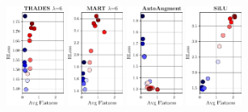 \begin{figure}
	\begin{minipage}[t]{0.12\textwidth} 
	\end{minipage}
	\begin{minipage}[t]{0.11\textwidth}
		\includegraphics[height=3.25cm]{plots_supp_flatness_epochs_correlation_joint_trades6}
	\end{minipage}
	\begin{minipage}[t]{0.11\textwidth}
		\includegraphics[height=3.25cm]{plots_supp_flatness_epochs_correlation_joint_mart6}
	\end{minipage}
	\begin{minipage}[t]{0.11\textwidth}
		\includegraphics[height=3.25cm]{plots_supp_flatness_epochs_correlation_joint_aa}
	\end{minipage}
	\begin{minipage}[t]{0.11\textwidth}
		\includegraphics[height=3.25cm]{plots_supp_flatness_epochs_correlation_joint_silu}

\end{minipage}
\end{figure}
